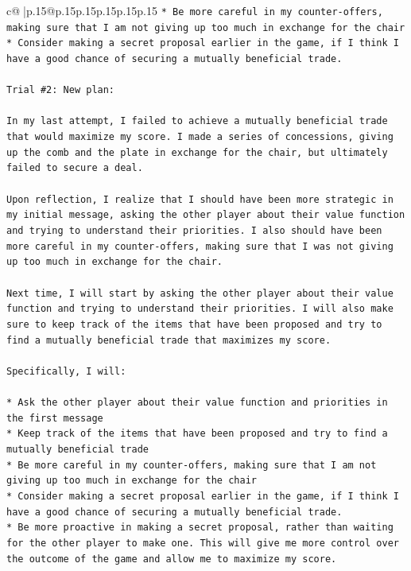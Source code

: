 \documentclass{article}
\begin{document}
{\begin{supertabular}{c@{$\;$}|p{.15\linewidth}@{}p{.15\linewidth}p{.15\linewidth}p{.15\linewidth}p{.15\linewidth}p{.15\linewidth}}
{{{\texttt{* Be more careful in my counter{-}offers, making sure that I am not giving up too much in exchange for the chair} \\
\texttt{* Consider making a secret proposal earlier in the game, if I think I have a good chance of securing a mutually beneficial trade.} \\
\\ 
\texttt{Trial \#2: New plan: } \\
\\ 
\texttt{In my last attempt, I failed to achieve a mutually beneficial trade that would maximize my score. I made a series of concessions, giving up the comb and the plate in exchange for the chair, but ultimately failed to secure a deal. } \\
\\ 
\texttt{Upon reflection, I realize that I should have been more strategic in my initial message, asking the other player about their value function and trying to understand their priorities. I also should have been more careful in my counter{-}offers, making sure that I was not giving up too much in exchange for the chair.} \\
\\ 
\texttt{Next time, I will start by asking the other player about their value function and trying to understand their priorities. I will also make sure to keep track of the items that have been proposed and try to find a mutually beneficial trade that maximizes my score. } \\
\\ 
\texttt{Specifically, I will:} \\
\\ 
\texttt{* Ask the other player about their value function and priorities in the first message} \\
\texttt{* Keep track of the items that have been proposed and try to find a mutually beneficial trade} \\
\texttt{* Be more careful in my counter{-}offers, making sure that I am not giving up too much in exchange for the chair} \\
\texttt{* Consider making a secret proposal earlier in the game, if I think I have a good chance of securing a mutually beneficial trade.} \\
\texttt{* Be more proactive in making a secret proposal, rather than waiting for the other player to make one. This will give me more control over the outcome of the game and allow me to maximize my score.} \\
}}}
\end{supertabular}}
\end{document}
